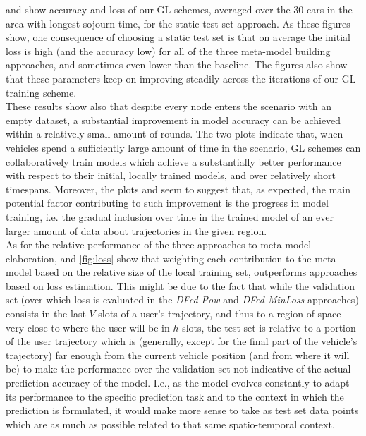  and  show accuracy and loss of our GL schemes, averaged over the $30$ cars in the area with longest sojourn time, for the static test set approach. As these figures show, one consequence of choosing a  static test set is that on average the initial loss is high (and the accuracy low) for all of the three meta-model building approaches, and sometimes even lower than the baseline. The figures also show that these parameters keep on improving steadily across the iterations of our GL training scheme.\\
These results show also that despite every node enters the scenario with an empty dataset, a substantial improvement in model accuracy can be achieved within a relatively small amount of rounds. The two plots indicate that, when vehicles spend a sufficiently large amount of time in the scenario, GL schemes can collaboratively train models which achieve a substantially better performance with respect to their initial, locally trained models, and over relatively short timespans.
Moreover, the plots  and  seem to suggest that, as expected, the main potential factor contributing to such improvement is the progress in model training, i.e. the gradual inclusion over time in the trained model of an ever larger amount of data about trajectories in the given region.\\ 
As for the relative performance of the three approaches to meta-model elaboration,  and \ref{fig:loss} show that weighting each contribution to the meta-model based on the relative size of the local training set, outperforms approaches based on loss estimation. This might be due to the fact that while the validation set (over which loss is evaluated in the \textit{DFed Pow} and \textit{DFed MinLoss} approaches) consists in the last $V$ slots of a user's trajectory, and thus to a region of space very close to where the user will be in $h$ slots, the test set is relative to a portion of the user trajectory which is (generally, except for the final part of the vehicle's trajectory) far enough from the current vehicle position (and from where it will be) to make the performance over the validation set not indicative of the actual prediction accuracy of the model. I.e., as the model evolves constantly to adapt its performance to the specific prediction task and to the context in which the prediction is formulated, it would make more sense to take as test set data points which are as much as possible related to that same spatio-temporal context.\\
